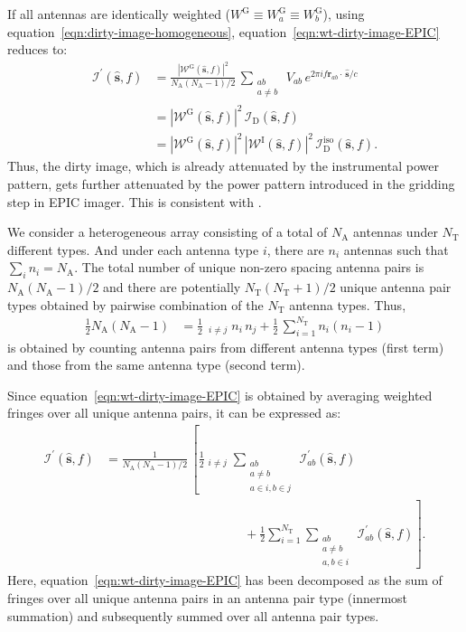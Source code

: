 \documentclass[a4paper,fleqn,usenatbib]{mnras}
\newcommand{\Nant}{N_\textrm{A}}
\begin{document}
If all antennas are identically weighted ($W^\textrm{G} \equiv W^\textrm{G}_a \equiv W^\textrm{G}_b$), using equation~\ref{eqn:dirty-image-homogeneous}, equation~\ref{eqn:wt-dirty-image-EPIC} reduces to: 
\begin{align}\label{eqn:wt-dirty-image-homogeneous}
  \mathcal{I}^\prime(\hat{\mathbf{s}},f) &= \frac{\left|\mathcal{W}^\textrm{G}(\hat{\mathbf{s}},f)\right|^2}{\Nant(\Nant-1)/2}\,\sum_{\substack{ab\\a\ne b}}\,V_{ab}\,e^{2\pi i f\mathbf{r}_{ab}\!\cdot\,\hat{\mathbf{s}}/c} \nonumber\\
  &= \left|\mathcal{W}^\textrm{G}(\hat{\mathbf{s}},f)\right|^2\,\mathcal{I}_\textrm{D}(\hat{\mathbf{s}},f) \nonumber\\
  &= \left|\mathcal{W}^\textrm{G}(\hat{\mathbf{s}},f)\right|^2\,\left|\mathcal{W}^\textrm{I}(\hat{\mathbf{s}},f)\right|^2\,\mathcal{I}_\textrm{D}^\textrm{iso}(\hat{\mathbf{s}},f).
\end{align}
Thus, the dirty image, which is already attenuated by the instrumental power pattern, gets further attenuated by the power pattern introduced in the gridding step in EPIC imager. This is consistent with \citet{mor09}.

We consider a heterogeneous array consisting of a total of $\Nant$ antennas under $N_\textrm{T}$ different types. And under each antenna type $i$, there are $n_i$ antennas such that $\sum_i n_i = \Nant$. The total number of unique non-zero spacing antenna pairs is $\Nant(\Nant-1)/2$ and there are potentially $N_\textrm{T}(N_\textrm{T}+1)/2$ unique antenna pair types obtained by pairwise combination of the $N_\textrm{T}$ antenna types. Thus,
\begin{align}\label{eqn:total-baselines}
  \frac{1}{2}\Nant(\Nant-1) &= \frac{1}{2}\,\mathop{\sum_{i=1}^{N_\textrm{T}}\sum_{j=1}^{N_\textrm{T}}}_{i\ne j} n_i\,n_j + \frac{1}{2}\,\sum_{i=1}^{N_\textrm{T}} n_i(n_i-1)
\end{align}
is obtained by counting antenna pairs from different antenna types (first term) and those from the same antenna type (second term). 

Since equation~\ref{eqn:wt-dirty-image-EPIC} is obtained by averaging weighted fringes over all unique antenna pairs, it can be expressed as: 
\begin{align}\label{eqn:wt-dirty-image-EPIC-decomp}
  \mathcal{I}^\prime(\hat{\mathbf{s}},f) &= \frac{1}{\Nant(\Nant-1)/2}\,\left[\frac{1}{2}\mathop{\sum_{i=1}^{N_\textrm{T}}\sum_{j=1}^{N_\textrm{T}}}_{i\ne j}\sum_{\substack{ab\\a\ne b\\a\in i, b\in j}}\,\mathcal{I}^\prime_{ab}(\hat{\mathbf{s}},f)\right. \nonumber\\ 
  &\qquad\qquad\qquad\qquad\qquad\quad + \left.\frac{1}{2}\sum_{i=1}^{N_\textrm{T}}\sum_{\substack{ab\\a\ne b\\a,b\in i}}\,\mathcal{I}^\prime_{ab}(\hat{\mathbf{s}},f)\right]. 
\end{align}
Here, equation~\ref{eqn:wt-dirty-image-EPIC} has been decomposed as the sum of fringes over all unique antenna pairs in an antenna pair type (innermost summation) and subsequently summed over all antenna pair types. 
\end{document}

